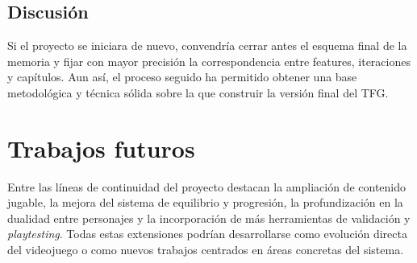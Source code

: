 \subsection{Discusión}
Si el proyecto se iniciara de nuevo, convendría cerrar antes el esquema final de la
memoria y fijar con mayor precisión la correspondencia entre features, iteraciones y
capítulos. Aun así, el proceso seguido ha permitido obtener una base metodológica y
técnica sólida sobre la que construir la versión final del TFG.

\section{Trabajos futuros}
Entre las líneas de continuidad del proyecto destacan la ampliación de contenido jugable,
la mejora del sistema de equilibrio y progresión, la profundización en la dualidad entre
personajes y la incorporación de más herramientas de validación y \textit{playtesting}.
Todas estas extensiones podrían desarrollarse como evolución directa del videojuego o como
nuevos trabajos centrados en áreas concretas del sistema.
